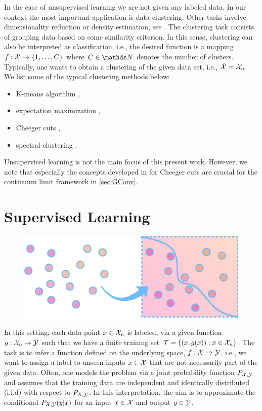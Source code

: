 In the case of unsupervised learning we are not given any labeled data. In our context the most important application is data clustering. Other tasks involve dimensionality reduction or density estimation, see \cite{subramanya2014graph}. The clustering task consists of grouping data based on some similarity criterion. In this sense, clustering can also be interpreted as classification, i.e., the desired function is a mapping $f:\tilde{\mathcal{X}}\to \{1,\ldots, C\}$ where $C\in\N$ denotes the number of clusters. Typically, one wants to obtain a clustering of the given data set, i.e., $\tilde{\mathcal{X}} = \mathcal{X}_n$. We list some of the typical clustering methods below:
%
\begin{itemize}
\item K-means algorithm \cite{steinhaus1956division},
\item expectation maximization  \cite{dempster1977maximum},
\item Cheeger cuts \cite{GarcSlep15, szlam2009total, trillos2016consistency, garcia2022graph},
\item spectral clustering \cite{trillos2018variational, trillos2021geometric, hoffmann2022spectral}.
\end{itemize}
%
%
Unsupervised learning is not the main focus of this present work. However, we note that especially the concepts developed in \cite{GarcSlep15} for Cheeger cuts are crucial for the continuum limit framework in \cref{sec:GConv}.

\section{Supervised Learning}\label{sec:PSL}
\begin{figure}
\centering
\includegraphics[width=.5\textwidth]{atelier/paradigms/SL.pdf}
\end{figure}
%
In this setting, each data point $x\in\mathcal{X}_n$ is labeled, via a given function $g:\mathcal{X}_n\to\mathcal{\mathcal{Y}}$ such that we have a finite training set $\mathcal{T} = \{(x,g(x)): x\in\mathcal{X}_n\}$. The task is to infer a function defined on the underlying space, $f:\mathcal{X} \to\mathcal{\mathcal{Y}}$, i.e., we want to assign a label to unseen inputs $x\in\mathcal{X}$ that are not necessarily part of the given data. Often, one models the problem via a joint probability function $P_{\mathcal{X},\mathcal{\mathcal{Y}}}$ and assumes that the training data are independent and identically distributed (i.i.d) with respect to $P_{\mathcal{X},\mathcal{\mathcal{Y}}}$. In this interpretation, the aim is to approximate the conditional $P_{\mathcal{X},\mathcal{\mathcal{Y}}}(y|x)$ for an input $x\in\mathcal{X}$ and output $y\in\mathcal{\mathcal{Y}}$. 

